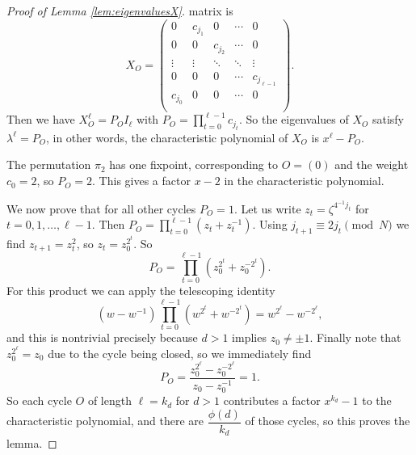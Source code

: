 \documentclass[10pt,a4paper]{amsart}
\newcommand{\dprod}{\displaystyle\prod}
\begin{document}
\begin{proof}[Proof of Lemma \ref{lem:eigenvaluesX}]
    matrix is
    \[ X_O = \begin{pmatrix}
        0       & c_{j_1} & 0       & \cdots & 0 \\
        0       & 0       & c_{j_2} & \cdots & 0 \\
        \vdots  & \vdots  & \ddots  & \ddots & \vdots \\
        0       & 0       & 0       & \cdots & c_{j_{\ell-1}} \\
        c_{j_0} & 0       & 0       & \cdots & 0 \\
    \end{pmatrix} . \]
    Then we have $ X_O^{\ell} = P_O I_{\ell} $ with $ P_O = \dprod_{t=0}^{\ell-1} c_{j_t} $. So the eigenvalues
    of $ X_O $ satisfy $ \lambda^{\ell} = P_O $, in other words, the characteristic polynomial of $ X_O $ is
    $ x^{\ell} - P_O $.

    The permutation $ \pi_2 $ has one fixpoint, corresponding to $ O = (0) $ and the weight $ c_0 = 2 $, so
    $ P_O = 2 $. This gives a factor $ x - 2 $ in the characteristic polynomial.

    We now prove that for all other cycles $ P_O = 1 $. Let us write $ z_t = \zeta^{4^{-1} j_t} $ for
    $ t = 0, 1, \ldots, \ell-1 $. Then $ P_O = \dprod_{t=0}^{\ell-1} \left( z_t + z_t^{-1} \right) $.
    Using $ j_{t+1} \equiv 2 j_t \pmod{N} $ we find $ z_{t+1} = z_t^2 $, so $ z_t = z_0^{2^t} $. So
    \[ P_O = \dprod_{t=0}^{\ell-1} \left( z_0^{2^t} + z_0^{-2^t} \right) . \]
    For this product we can apply the telescoping identity
    \[ (w - w^{-1}) \dprod_{t=0}^{\ell-1} \left( w^{2^t} + w^{-2^t} \right) = w^{2^{\ell}} - w^{-2^{\ell}} , \]
    and this is nontrivial precisely because $ d > 1 $ implies $ z_0 \neq \pm 1 $. Finally note that
    $ z_0^{2^{\ell}} = z_0 $ due to the cycle being closed, so we immediately find
    \[ P_O = \dfrac{z_0^{2^{\ell}} - z_0^{-2^{\ell}}}{z_0 - z_0^{-1}} = 1. \]
    So each cycle $ O $ of length $ \ell = k_d $ for $ d > 1 $ contributes a factor $ x^{k_d} - 1 $ to the
    characteristic polynomial, and there are $ \dfrac{\phi(d)}{k_d} $ of those cycles, so this proves the lemma.
\end{proof}
\end{document}
